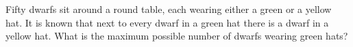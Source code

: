 Fifty dwarfs sit around a round table, each wearing either a green or a yellow hat. It is known that next to every dwarf in a green hat there is a dwarf in a yellow hat. What is the maximum possible number of dwarfs wearing green hats?

